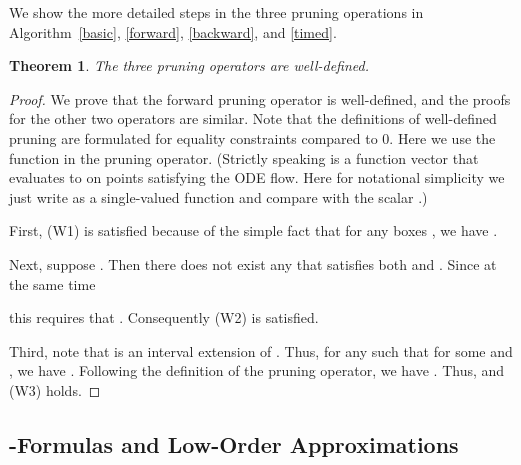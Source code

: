 \documentclass[12pt]{article}
\newtheorem{theorem}{Theorem}[section]
\begin{document}
\begin{algorithm}\label{alg:BackwardP}
\caption{}\label{backward}
\begin{algorithmic}[1]
  \State 
  \State 
  \While{}
      \State 
      \State 
  \EndWhile
  \State \Return{}
\end{algorithmic}
\end{algorithm}

We show the more detailed steps in the three pruning operations in Algorithm~\ref{basic}, \ref{forward}, \ref{backward}, and \ref{timed}.

\begin{algorithm}\label{alg:I_timeP}
\caption{}\label{timed}
\begin{algorithmic}[1]
  \State 
  \State 
  \While{}
      \State 
      \If{}
          \State 
      \Else
          \State 
      \EndIf
  \EndWhile
  \State \Return{}
\end{algorithmic}
\end{algorithm}

\begin{theorem}
The three pruning operators are well-defined.
\end{theorem}

\begin{proof}
We prove that the forward pruning operator is well-defined, and the proofs for the other two operators are similar. Note that the definitions of well-defined pruning are formulated for equality constraints compared to 0. Here we use the function  in the pruning operator. (Strictly speaking  is a function vector that evaluates to  on points satisfying the ODE flow. Here for notational simplicity we just write  as a single-valued function and compare with the scalar .)

First, (W1) is satisfied because of the simple fact that for any boxes , we have .

Next, suppose . Then there does not exist any  that satisfies both  and . Since at the same time

this requires that . Consequently (W2) is satisfied.

Third, note that  is an interval extension of . Thus, for any  such that  for some  and , we have . Following the definition of the pruning operator, we have . Thus,  and (W3) holds.
\end{proof}

\subsection{-Formulas and Low-Order Approximations}
\end{document}
